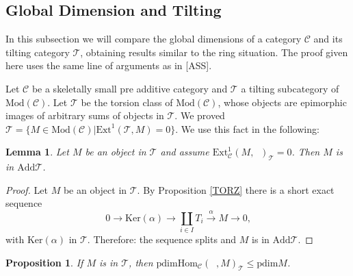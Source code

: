 \documentclass{amsart}
\theoremstyle{plain}
\newtheorem{lemma}{Lemma}
\newtheorem{proposition}{Proposition}
\numberwithin{equation}{section}
\begin{document}
\subsection{ Global Dimension and Tilting}

In this subsection we will compare the global dimensions of a category $\mathcal{C}$ and its tilting category $\mathcal{T}$, obtaining results
similar to the ring situation. The proof given here uses the same line of
arguments as in [ASS].

Let $\mathcal{C}$ be a skeletally small pre additive category and $\mathcal{T}$ a tilting subcategory of $\mathrm{\mathrm{Mod}}(\mathcal{C})$. Let $\mathscr T$ be the torsion class of $\mathrm{\mathrm{Mod}}(\mathcal{C})$,
whose objects are epimorphic images of arbitrary sums of objects in $\mathcal{T}$. We proved $\mathscr T=\{M\in \mathrm{\mathrm{Mod}}(\mathcal{C})|\mathrm{Ext}^{1}(\mathcal{T},M)=0\}$. We use this fact in the following:

\begin{lemma}
\label{GD1} Let $M$ be an object in $\mathscr{T}$ and assume $\mathrm{Ext}_{\mathcal{C}}^{1}(M,\;\;)_{\mathscr{T}}=0$. Then $M$ is in $\mathrm{Add}\mathcal{T}$.
\end{lemma}

\begin{proof}
Let $M$ be an object in $\mathscr{T}$. By Proposition \ref{TORZ} there is a
short exact sequence
\begin{equation*}
0\rightarrow \mathrm{Ker}(\alpha )\rightarrow \coprod_{i\in I}T_{i}\xrightarrow{\alpha}M\rightarrow 0\text{,}
\end{equation*}with $\mathrm{Ker}(\alpha )$ in $\mathscr{T}$. Therefore: the sequence
splits and $M$ is in $\mathrm{Add}\mathcal{T}$.
\end{proof}

\begin{proposition}
If $M$ is in $\mathscr{T}$, then $\mathrm{pdim}\mathrm{Hom}_{\mathcal{C}}(\;\;,M)_{\mathcal{T}}\leq \mathrm{pdim}M$.
\end{proposition}
\end{document}
